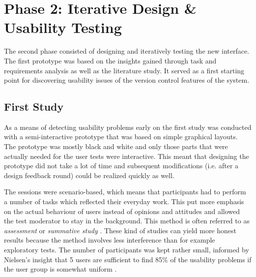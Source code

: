 

\section{Phase 2: Iterative Design \& Usability Testing}
The second phase consisted of designing and iteratively testing the new interface. The first prototype was based on the insights gained through task and requirements analysis as well as the literature study. It served as a first starting point for discovering usability issues of the version control features of the system.



\subsection{First Study}
As a means of detecting usability problems early on the first study was conducted with a semi-interactive prototype that was based on simple graphical layouts. The prototype was mostly black and white and only those parts that were actually needed for the user tests were interactive. This meant that designing the prototype did not take a lot of time and subsequent modifications (i.e. after a design feedback round) could be realized quickly as well.

The sessions were scenario-based, which means that participants had to perform a number of tasks which reflected their everyday work. This put more emphasis on the actual behaviour of users instead of opinions and attitudes and allowed the test moderator to stay in the background. This method is often referred to as \textit{assessment} or \textit{summative study} \cite{rubin_handbook_2008,goodman_observing_2012}. These kind of studies can yield more honest results because the method involves less interference than for example exploratory tests. The number of participants was kept rather small, informed by Nielsen's insight that 5 users are sufficient to find 85\% of the usability problems if the user group is somewhat uniform \cite{nielsen_why_2000}.

